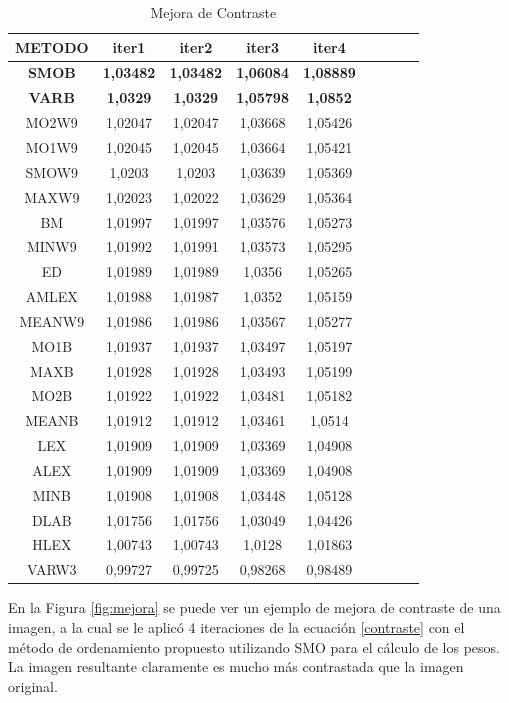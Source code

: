 \begin{table}
\caption{ Mejora de Contraste}
\label{tab:EXP_N1}
\begin{tabular}{ccccccccc}
\hline METODO& iter1&iter2&iter3&iter4\\
\hline  \textbf{SMOB}& \textbf{1,03482}& \textbf{1,03482}& \textbf{1,06084}& \textbf{1,08889}\\
\hline  \textbf{VARB}& \textbf{1,0329}& \textbf{1,0329}& \textbf{1,05798}& \textbf{1,0852}\\
\hline MO2W9&1,02047&1,02047&1,03668&1,05426\\
\hline MO1W9&1,02045&1,02045&1,03664&1,05421\\
\hline SMOW9&1,0203&1,0203&1,03639&1,05369\\
\hline MAXW9&1,02023&1,02022&1,03629&1,05364\\
\hline BM&1,01997&1,01997&1,03576&1,05273\\
\hline MINW9&1,01992&1,01991&1,03573&1,05295\\
\hline ED&1,01989&1,01989&1,0356&1,05265\\
\hline AMLEX&1,01988&1,01987&1,0352&1,05159\\
\hline MEANW9&1,01986&1,01986&1,03567&1,05277\\
\hline MO1B&1,01937&1,01937&1,03497&1,05197\\
\hline MAXB&1,01928&1,01928&1,03493&1,05199\\
\hline MO2B&1,01922&1,01922&1,03481&1,05182\\
\hline MEANB&1,01912&1,01912&1,03461&1,0514\\
\hline LEX&1,01909&1,01909&1,03369&1,04908\\
\hline ALEX&1,01909&1,01909&1,03369&1,04908\\
\hline MINB&1,01908&1,01908&1,03448&1,05128\\
\hline DLAB&1,01756&1,01756&1,03049&1,04426\\
\hline HLEX&1,00743&1,00743&1,0128&1,01863\\
\hline VARW3&0,99727&0,99725&0,98268&0,98489\\

\hline

\end{tabular}
\end{table}

En la Figura \ref{fig:mejora} se puede ver un ejemplo de mejora de contraste de una imagen, a la cual se le aplicó 4 iteraciones de la ecuación \ref{contraste} con el método de ordenamiento propuesto utilizando SMO para el cálculo de los pesos. La imagen resultante claramente es mucho más contrastada que la imagen original. 
 
